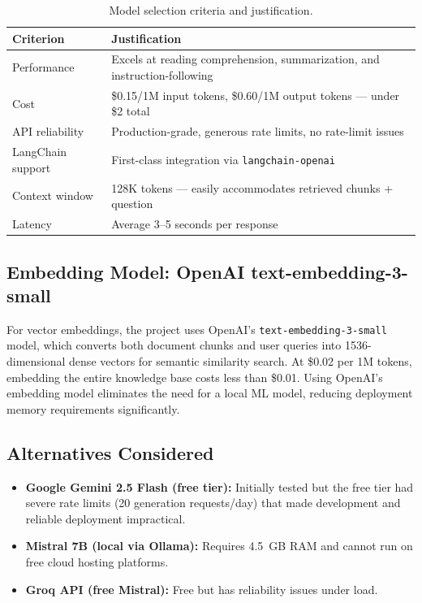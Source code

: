 \documentclass[12pt, a4paper]{article}
\begin{document}
\begin{table}[h]
\centering
\begin{tabular}{@{}ll@{}}
\toprule
\textbf{Criterion} & \textbf{Justification} \\
\midrule
Performance & Excels at reading comprehension, summarization, and instruction-following \\
Cost & \$0.15/1M input tokens, \$0.60/1M output tokens --- under \$2 total \\
API reliability & Production-grade, generous rate limits, no rate-limit issues \\
LangChain support & First-class integration via \texttt{langchain-openai} \\
Context window & 128K tokens --- easily accommodates retrieved chunks + question \\
Latency & Average 3--5 seconds per response \\
\bottomrule
\end{tabular}
\caption{Model selection criteria and justification.}
\end{table}

\subsection{Embedding Model: OpenAI text-embedding-3-small}

For vector embeddings, the project uses OpenAI's \texttt{text-embedding-3-small} model, which converts both document chunks and user queries into 1536-dimensional dense vectors for semantic similarity search. At \$0.02 per 1M tokens, embedding the entire knowledge base costs less than \$0.01. Using OpenAI's embedding model eliminates the need for a local ML model, reducing deployment memory requirements significantly.

\subsection{Alternatives Considered}

\begin{itemize}[nosep]
    \item \textbf{Google Gemini 2.5 Flash (free tier):} Initially tested but the free tier had severe rate limits (20 generation requests/day) that made development and reliable deployment impractical.
    \item \textbf{Mistral 7B (local via Ollama):} Requires 4.5~GB RAM and cannot run on free cloud hosting platforms.
    \item \textbf{Groq API (free Mistral):} Free but has reliability issues under load.
\end{itemize}
\end{document}
